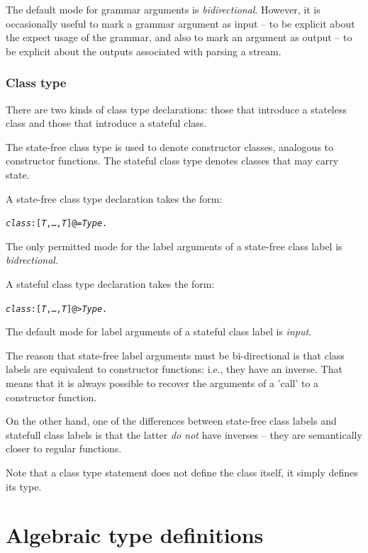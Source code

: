 The default mode for grammar arguments is \emph{bidirectional}. However, it is occasionally useful to mark a grammar argument as input -- to be explicit about the expect usage of the grammar, and also to mark an argument as output -- to be explicit about the outputs associated with parsing a stream.

\subsubsection{Class type}
\label{types:standard:class}

There are two kinds of class type declarations: those that introduce a stateless class and those that introduce a stateful class.

The state-free class type is used to denote constructor classes, analogous to constructor functions. The stateful class type denotes classes that may carry state.


A state-free class type declaration takes the form:
\begin{alltt}
\emph{class}:[\emph{T},\ldots,\emph{T\subn}] @= \emph{Type}.
\end{alltt}
The only permitted mode for the label arguments of a state-free class label is \emph{bidrectional}.

A stateful class type declaration takes the form:
\begin{alltt}
\emph{class}:[\emph{T},\ldots,\emph{T\subn}] @> \emph{Type}.
\end{alltt}
The default mode for label arguments of a stateful class label is \emph{input}.

\begin{aside}
The reason that state-free label arguments must be bi-directional is that class labels are equivalent to constructor functions: i.e., they have an inverse. That means that it is always possible to recover the arguments of a 'call' to a constructor function.

On the other hand, one of the differences between state-free class labels and statefull class labels is that the latter \emph{do not} have inverses -- they are semantically closer to regular functions.
\end{aside}
Note that a class type statement does not define the class itself, it simply defines its type.

\section{Algebraic type definitions}
\label{type:algebraic}

